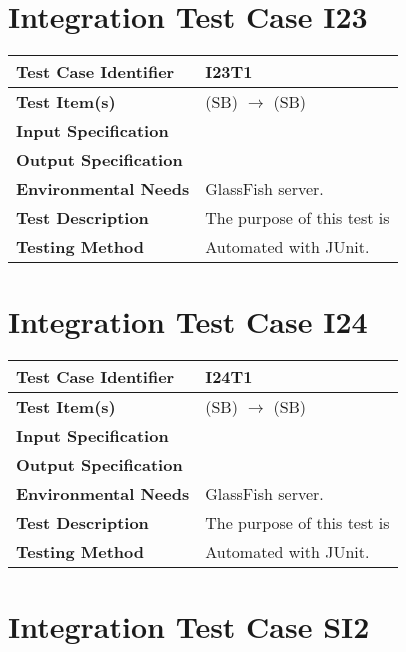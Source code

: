 \section{Integration Test Case I23}

\begin{longtable}{p{} | p{}}
\hline
\textbf{Test Case Identifier} & I23T1\\
\hline
\textbf{Test Item(s)} & (SB)  $\rightarrow$ (SB)  \\
\hline
\textbf{Input Specification} &  \\
\hline
\textbf{Output Specification} &  \\
\hline
\textbf{Environmental Needs} & GlassFish server. \\
\hline
\textbf{Test Description} & The purpose of this test is  \\
\hline
\textbf{Testing Method} & Automated with JUnit. \\
\hline
\end{longtable}

\section{Integration Test Case I24}

\begin{longtable}{p{} | p{}}
\hline
\textbf{Test Case Identifier} & I24T1\\
\hline
\textbf{Test Item(s)} & (SB)  $\rightarrow$ (SB)  \\
\hline
\textbf{Input Specification} &  \\
\hline
\textbf{Output Specification} &  \\
\hline
\textbf{Environmental Needs} & GlassFish server. \\
\hline
\textbf{Test Description} & The purpose of this test is  \\
\hline
\textbf{Testing Method} & Automated with JUnit. \\
\hline
\end{longtable}


\section{Integration Test Case SI2}

